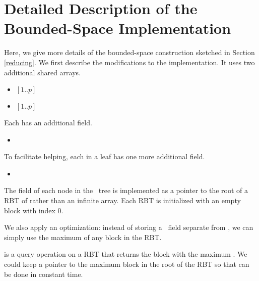 
\section{Detailed Description of the Bounded-Space Implementation}
\label{reducing-details}

\renewcommand{\algorithmiccomment}[1]{\hfill\eqparbox{COMMENTSINGLEAPP}{\com\ #1}}

Here, we give more details of the bounded-space construction sketched in Section \ref{reducing}.
We first describe the modifications to the implementation.
It uses two additional shared arrays.
\begin{itemize}
\item {} $[1..p]$ 
\item {} $[1..p]$ 
\end{itemize}
Each  has an additional field.
\begin{itemize}
\item {}  
\end{itemize}
To facilitate helping, each  in a leaf has one more additional field.
\begin{itemize}
\item {}  
\end{itemize}
The  field of each node in the \ordering\ tree is implemented as a pointer to the root of a RBT of  rather than an infinite array.  Each RBT is initialized with an empty block with index 0.


We also apply an optimization:  instead of storing a \head\ field separate from ,
we can simply use the maximum  of any block in the  RBT.


 is a query operation on a RBT that returns the block with the maximum .
We could keep a pointer to the maximum block in the root of the RBT so that 
can be done in constant time.

